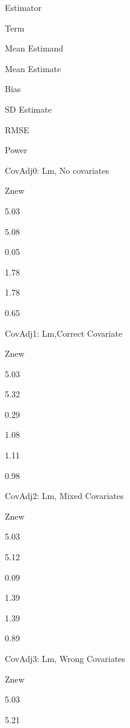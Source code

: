 \documentclass[
  12pt,
]{book}
\newenvironment{Shaded}{\begin{snugshade}}{\end{snugshade}}
\newcommand{\CommentTok}[1]{\textcolor[rgb]{0.56,0.35,0.01}{\textit{#1}}}
\newcommand{\DecValTok}[1]{\textcolor[rgb]{0.00,0.00,0.81}{#1}}
\newcommand{\KeywordTok}[1]{\textcolor[rgb]{0.13,0.29,0.53}{\textbf{#1}}}
\newcommand{\NormalTok}[1]{#1}
\newcommand{\StringTok}[1]{\textcolor[rgb]{0.31,0.60,0.02}{#1}}
\theoremstyle{definition}
\theoremstyle{definition}
\theoremstyle{definition}
\theoremstyle{remark}
\begin{document}
\begin{Shaded}
\end{Shaded}

Estimator

Term

Mean Estimand

Mean Estimate

Bias

SD Estimate

RMSE

Power

CovAdj0: Lm, No covariates

Znew

5.03

5.08

0.05

1.78

1.78

0.65

CovAdj1: Lm,Correct Covariate

Znew

5.03

5.32

0.29

1.08

1.11

0.98

CovAdj2: Lm, Mixed Covariates

Znew

5.03

5.12

0.09

1.39

1.39

0.89

CovAdj3: Lm, Wrong Covariates

Znew

5.03

5.21
\end{document}
